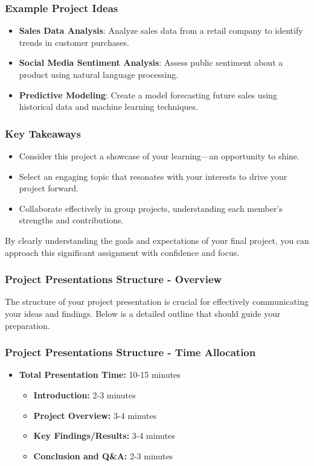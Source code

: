 \documentclass[aspectratio=169]{beamer}
\begin{document}
\begin{frame}[fragile]
    \frametitle{Example Project Ideas}
    
    \begin{itemize}
        \item \textbf{Sales Data Analysis}: Analyze sales data from a retail company to identify trends in customer purchases.
        \item \textbf{Social Media Sentiment Analysis}: Assess public sentiment about a product using natural language processing.
        \item \textbf{Predictive Modeling}: Create a model forecasting future sales using historical data and machine learning techniques.
    \end{itemize}
\end{frame}

\begin{frame}[fragile]
    \frametitle{Key Takeaways}
    
    \begin{itemize}
        \item Consider this project a showcase of your learning—an opportunity to shine.
        \item Select an engaging topic that resonates with your interests to drive your project forward.
        \item Collaborate effectively in group projects, understanding each member’s strengths and contributions.
    \end{itemize}
    
    By clearly understanding the goals and expectations of your final project, you can approach this significant assignment with confidence and focus.
\end{frame}

\begin{frame}[fragile]
    \frametitle{Project Presentations Structure - Overview}
    The structure of your project presentation is crucial for effectively communicating your ideas and findings. Below is a detailed outline that should guide your preparation.
\end{frame}

\begin{frame}[fragile]
    \frametitle{Project Presentations Structure - Time Allocation}
    \begin{itemize}
        \item \textbf{Total Presentation Time:} 10-15 minutes
            \begin{itemize}
                \item \textbf{Introduction:} 2-3 minutes
                \item \textbf{Project Overview:} 3-4 minutes
                \item \textbf{Key Findings/Results:} 3-4 minutes
                \item \textbf{Conclusion and Q\&A:} 2-3 minutes
            \end{itemize}
    \end{itemize}
\end{frame}
\end{document}
